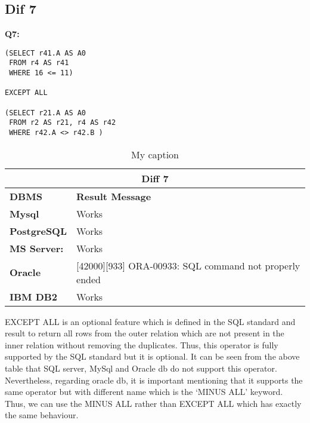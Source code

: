 \subsection{Dif 7}
  
\begin{mdframed}[backgroundcolor=gray!20] 
\textbf{Q7:}
\begin{lstlisting}
(SELECT r41.A AS A0
 FROM r4 AS r41
 WHERE 16 <= 11)
 
EXCEPT ALL

(SELECT r21.A AS A0
 FROM r2 AS r21, r4 AS r42
 WHERE r42.A <> r42.B )
\end{lstlisting}
\end{mdframed}

\begin{table}[h]
\centering
\caption{My caption}
\label{my-label}
\begin{tabular}{|p{2cm}|p{12cm}|}
\hline
\multicolumn{2}{|c|}{\textbf{Diff 7}}                                                                       \\ \hline
\textbf{DBMS}                              & \textbf{Result Message}                                        \\ \hline
{\color[HTML]{333333} \textbf{Mysql}}      & {\color[HTML]{333333} Works}                                   \\ \hline
{\color[HTML]{333333} \textbf{PostgreSQL}} & {\color[HTML]{333333} Works}                                   \\ \hline
{\color[HTML]{333333} \textbf{MS Server:}} & {\color[HTML]{333333} Works}                                   \\ \hline
\textbf{Oracle}                            & {[}42000{]}{[}933{]} ORA-00933: SQL command not properly ended \\ \hline
\textbf{IBM DB2}                           & Works                                                          \\ \hline
\end{tabular}
\end{table}

EXCEPT ALL is an optional feature which is defined in the SQL standard and result to return all rows from the outer relation which are not present in the inner relation without removing the duplicates. Thus, this operator is fully supported by the SQL standard but it is optional.  It can be seen from the above table that SQL server, MySql and Oracle db do not support this operator. Nevertheless, regarding oracle db, it is important mentioning that it supports the same operator but with different name which is the ‘MINUS ALL’ keyword. Thus, we can use the MINUS ALL rather than EXCEPT ALL which has exactly the same behaviour.   



